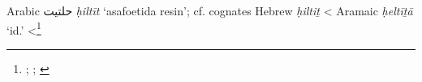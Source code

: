 \begin{etymology}\label{ety:hiltit}
Arabic {حلتيت} \textit{ḥiltīt} `asafoetida resin'; cf. cognates Hebrew  \textit{ḥiltiṯ}
< Aramaic {} \textit{ḥeltīṯā} `id.'
<\footnote{\textcite[140]{fraenkel_aramaischen_1886}; \textcite[36]{low_aramaeische_1881}; \textcite[vol. 3, p. 452-455]{low_flora_1924}}
\end{etymology}